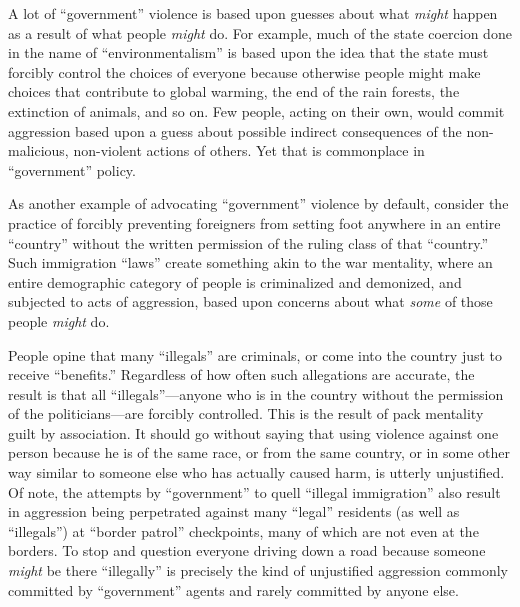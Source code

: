 \documentclass{book}
\begin{document}
A lot of \enquote{government} violence is based upon guesses about what \emph{might} happen as a result of what people \emph{might} do. For example, much of the state coercion done in the name of \enquote{environmentalism} is based upon the idea that the state must forcibly control the choices of everyone because otherwise people might make choices that contribute to global warming, the end of the rain forests, the extinction of animals, and so on. Few people, acting on their own, would commit aggression based upon a guess about possible indirect consequences of the non-malicious, non-violent actions of others. Yet that is commonplace in \enquote{government} policy.

As another example of advocating \enquote{government} violence by default, consider the practice of forcibly preventing foreigners from setting foot anywhere in an entire \enquote{country} without the written permission of the ruling class of that \enquote{country.} Such immigration \enquote{laws} create something akin to the war mentality, where an entire demographic category of people is criminalized and demonized, and subjected to acts of aggression, based upon concerns about what \emph{some} of those people \emph{might} do.

People opine that many \enquote{illegals} are criminals, or come into the country just to receive \enquote{benefits.} Regardless of how often such allegations are accurate, the result is that all \enquote{illegals}---anyone who is in the country without the permission of the politicians---are forcibly controlled. This is the result of pack mentality guilt by association. It should go without saying that using violence against one person because he is of the same race, or from the same country, or in some other way similar to someone else who has actually caused harm, is utterly unjustified. Of note, the attempts by \enquote{government} to quell \enquote{illegal immigration} also result in aggression being perpetrated against many \enquote{legal} residents (as well as \enquote{illegals}) at \enquote{border patrol} checkpoints, many of which are not even at the borders. To stop and question everyone driving down a road because someone \emph{might} be there \enquote{illegally} is precisely the kind of unjustified aggression commonly committed by \enquote{government} agents and rarely committed by anyone else.
\end{document}
